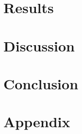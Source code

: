 \documentclass[12pt,oneside,a4paper]{article}
\begin{document}
\section{Results}
%

\section{Discussion}
%

\section{Conclusion}
%

\newpage
\printbibliography

\newpage

\section*{Appendix}
%
\end{document}
